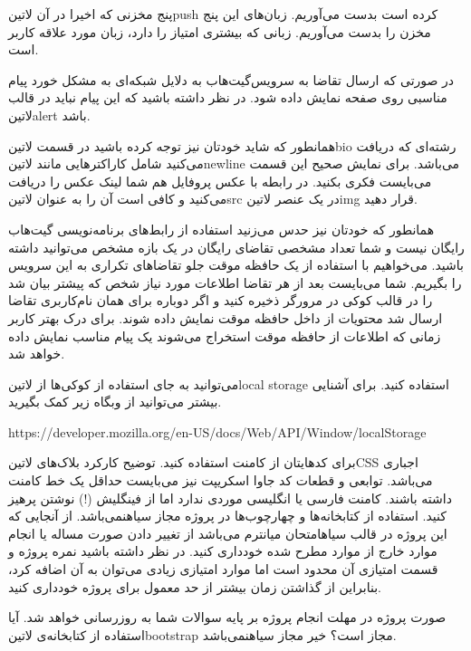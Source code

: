 \documentclass[../main.tex]{subfiles}
\begin{document}
 پنج مخزنی که اخیرا در آن ‌لاتین{push} کرده است بدست می‌آوریم.
 زبان‌های این پنج مخزن را بدست می‌آوریم.
 زبانی که بیشتری امتیاز را دارد، زبان مورد علاقه کاربر است.

در صورتی که ارسال تقاضا به سرویس‌گیت‌هاب به دلایل شبکه‌ای به مشکل خورد پیام مناسبی روی صفحه نمایش داده شود.
در نظر داشته باشید که این پیام نباید در قالب ‌لاتین{alert} باشد.

همانطور که شاید خودتان نیز توجه کرده باشید در قسمت ‌لاتین{bio} رشته‌ای که دریافت می‌کنید شامل کاراکترهایی مانند ‌لاتین{newline} می‌باشد. برای نمایش صحیح این قسمت می‌بایست فکری بکنید.
در رابطه با عکس پروفایل هم شما لینک عکس را دریافت می‌کنید و کافی است آن را به عنوان ‌لاتین{src} در یک عنصر ‌لاتین{img} قرار دهید.

همانطور که خودتان نیز حدس می‌زنید استفاده از رابط‌های برنامه‌نویسی گیت‌هاب رایگان نیست و شما تعداد مشخصی تقاضای رایگان در یک بازه مشخص می‌توانید داشته
باشید. می‌خواهیم با استفاده از یک حافظه موقت جلو تقاضاهای تکراری به این سرویس را بگیریم. شما می‌بایست بعد از هر تقاضا اطلاعات مورد نیاز شخص که پیشتر
بیان شد را در قالب کوکی در مرورگر ذخیره کنید و اگر دوباره برای همان نام‌کاربری تقاضا ارسال شد محتویات از داخل حافظه موقت نمایش داده شوند.
برای درک بهتر کاربر زمانی که اطلاعات از حافظه موقت استخراج می‌شوند یک پیام مناسب نمایش داده خواهد شد.

می‌توانید به جای استفاده از کوکی‌ها از ‌لاتین{local storage} استفاده کنید. برای آشنایی بیشتر می‌توانید از وبگاه زیر کمک بگیرید.


\begin{latin}\begin{center}
https://developer.mozilla.org/en-US/docs/Web/API/Window/localStorage
\end{center}\end{latin}



     برای کدهایتان از کامنت استفاده کنید. توضیح کارکرد بلاک‌های ‌لاتین{CSS} اجباری می‌باشد. توابعی و قطعات کد جاوا اسکریپت نیز می‌بایست حداقل یک خط کامنت داشته باشند.
     کامنت فارسی یا انگلیسی موردی ندارد اما از فینگلیش (!) نوشتن پرهیز کنید.
     استفاده از کتابخانه‌ها و چهارچوب‌ها در پروژه مجاز ‌سیاه{نمی‌باشد}.
     از آنجایی که این پروژه در قالب ‌سیاه{امتحان میانترم} می‌باشد از تغییر دادن صورت مساله یا انجام موارد خارج از موارد مطرح شده خودداری کنید.
     در نظر داشته باشید نمره پروژه و قسمت امتیازی آن محدود است اما موارد امتیازی زیادی می‌توان به آن اضافه کرد، بنابراین از گذاشتن زمان بیشتر از حد معمول برای پروژه خودداری کنید.


صورت پروژه در مهلت انجام پروژه بر پایه سوالات شما به روزرسانی خواهد شد.
 آیا استفاده از کتابخانه‌ی ‌لاتین{bootstrap} مجاز است؟
 خیر مجاز ‌سیاه{نمی‌باشد}.
\end{document}
